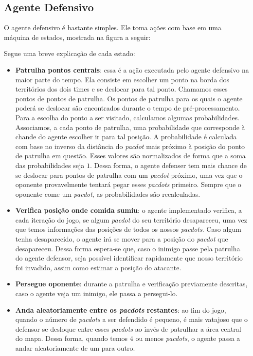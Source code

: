 \documentclass[a4paper,12pt]{article}
\begin{document}
\subsection{Agente Defensivo}
O agente defensivo é bastante simples. Ele toma ações com base em uma máquina de estados,
mostrada na figura a seguir:


Segue uma breve explicação de cada estado:

\begin{itemize}
  \item \textbf{Patrulha pontos centrais}: essa é a ação executada pelo agente defensivo
  na maior parte do tempo. Ela consiste em escolher um ponto na borda dos territórios
  dos dois times e se deslocar para tal ponto. Chamamos esses pontos de pontos de patrulha.
  Os pontos de patrulha para os quais o agente poderá se deslocar são encontrados durante o
  tempo de pré-processamento. Para a escolha do ponto a ser visitado, calculamos algumas
  probabilidades. Associamos, a cada ponto de patrulha, uma probabilidade que corresponde
  à chande do agente escolher ir para tal posição. A probabilidade é calculada com base
  no inverso da distância do \textit{pacdot} mais próximo à posição do ponto de patrulha
  em questão. Esses valores são normalizados de forma que a soma das probabilidades seja $1$.
  Dessa forma, o agente defenser tem mais chance de se deslocar para pontos de patrulha
  com um \textit{pacdot} próximo, uma vez que o oponente provavelmente tentará pegar
  esses \textit{pacdots} primeiro. Sempre que o oponente come um \textit{pacdot}, as probabilidades
  são recalculadas.

  \item \textbf{Verifica posição onde comida sumiu}: o agente implementado verifica,
  a cada iteração do jogo, se algum \textit{pacdot} do seu território desapareceu,
  uma vez que temos informações das posições de todos os nossos \textit{pacdots}.
  Caso algum tenha desaparecido, o agente irá se mover para a posição
  do \textit{pacdot} que desapareceu. Dessa forma espera-se que, caso o inimigo passe
  pela patrulha do agente defensor, seja possível identificar rapidamente que
  nosso território foi invadido, assim como estimar a posição do atacante.

  \item \textbf{Persegue oponente}: durante a patrulha e verificação previamente
  descritas, caso o agente veja um inimigo, ele passa a persegui-lo.

  \item \textbf{Anda aleatoriamente entre os \textit{pacdots} restantes}: ao fim do jogo,
  quando o número de \textit{pacdots} a ser defendido é pequeno, é mais vatajoso
  que o defensor se desloque entre esses \textit{pacdots} ao invés de patrulhar a área
  central do mapa. Dessa forma, quando temos $4$ ou menos \textit{pacdots}, o agente passa
  a andar aleatoriamente de um para outro.
\end{itemize}
\end{document}
